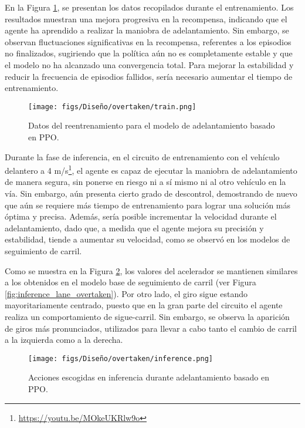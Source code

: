En la Figura \ref{fig:train_overtaken}, se presentan los datos recopilados durante el entrenamiento. Los resultados muestran una mejora progresiva en la recompensa, indicando que el agente ha aprendido a realizar la maniobra de adelantamiento. Sin embargo, se observan fluctuaciones significativas en la recompensa, referentes a los episodios no finalizados, sugiriendo que la política aún no es completamente estable y que el modelo no ha alcanzado una convergencia total. Para mejorar la estabilidad y reducir la frecuencia de episodios fallidos, sería necesario aumentar el tiempo de entrenamiento.
\begin{figure}[ht]
\centering
\texttt{[image: figs/Diseño/overtaken/train.png]}
\caption{Datos del reentrenamiento para el modelo de adelantamiento basado en \ac{PPO}.}
\label{fig:train_overtaken}
\end{figure}

Durante la fase de inferencia, en el circuito de entrenamiento con el vehículo delantero a 4 m/s\footnote{\url{https://youtu.be/MOkeUKRlw9o}}, el agente es capaz de ejecutar la maniobra de adelantamiento de manera segura, sin ponerse en riesgo ni a sí mismo ni al otro vehículo en la vía. Sin embargo, aún presenta cierto grado de descontrol, demostrando de nuevo que aún se requiere más tiempo de entrenamiento para lograr una solución más óptima y precisa. Además, sería posible incrementar la velocidad durante el adelantamiento, dado que, a medida que el agente mejora su precisión y estabilidad, tiende a aumentar su velocidad, como se observó en los modelos de seguimiento de carril.

Como se muestra en la Figura \ref{fig:inference_overtaken}, los valores del acelerador se mantienen similares a los obtenidos en el modelo base de seguimiento de carril (ver Figura \ref{fig:inference_lane_overtaken}). Por otro lado, el giro sigue estando mayoritariamente centrado, puesto que en la gran parte del circuito el agente realiza un comportamiento de sigue-carril. Sin embargo, se observa la aparición de giros más pronunciados, utilizados para llevar a cabo tanto el cambio de carril a la izquierda como a la derecha.

\begin{figure}[ht]
\centering
\texttt{[image: figs/Diseño/overtaken/inference.png]}
\caption{Acciones escogidas en inferencia durante adelantamiento basado en \ac{PPO}.}
\label{fig:inference_overtaken}
\end{figure}
\newpage

